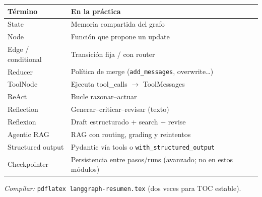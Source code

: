 \documentclass[11pt,a4paper]{article}
\begin{document}
\begin{center}
\begin{tabular}{@{}p{4.2cm}p{11cm}@{}}
\toprule
\textbf{Término} & \textbf{En la práctica} \\
\midrule
State & Memoria compartida del grafo \\
Node & Función que propone un update \\
Edge / conditional & Transición fija / con router \\
Reducer & Política de merge (\texttt{add\_messages}, overwrite\ldots) \\
ToolNode & Ejecuta tool\_calls $\to$ ToolMessages \\
ReAct & Bucle razonar--actuar \\
Reflection & Generar--criticar--revisar (texto) \\
Reflexion & Draft estructurado + search + revise \\
Agentic RAG & RAG con routing, grading y reintentos \\
Structured output & Pydantic vía tools o \texttt{with\_structured\_output} \\
Checkpointer & Persistencia entre pasos/runs (avanzado; no en estos módulos) \\
\bottomrule
\end{tabular}
\end{center}

\vspace{1em}
\begin{center}
\end{center}

\vspace{0.8em}
\noindent\textit{Compilar:} \texttt{pdflatex langgraph-resumen.tex} (dos veces para TOC estable).
\end{document}
